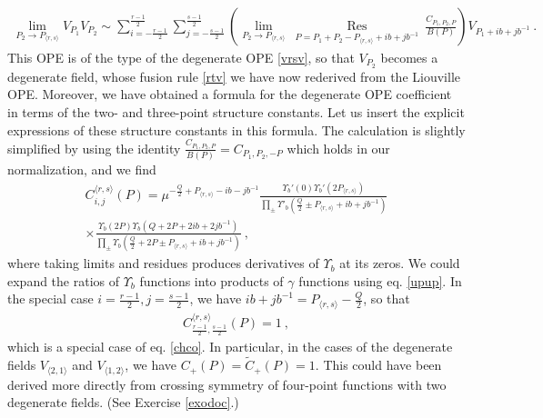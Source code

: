 \documentclass[12pt, a4paper, notitlepage, twoside]{report}
\numberwithin{equation}{section}
\theoremstyle{break}
\begin{document}
\begin{align}
\underset{P_2\to P_{\langle r,s \rangle}}{\lim} V_{P_1}V_{P_2} \sim \sum_{i=-\frac{r-1}{2}}^{\frac{r-1}{2}} \sum_{j=-\frac{s-1}{2}}^{\frac{s-1}{2}}
 \left(\underset{P_2\to P_{\langle r,s \rangle}}{\lim}\ \underset{P=P_1+P_2-P_{\langle r,s \rangle}+ib+jb^{-1}}{\operatorname{ Res}}\ \frac{C_{P_1,P_2,P}}{B(P)}\right) V_{P_1 + ib+jb^{-1}}\ .
\label{crs}
\end{align}
This OPE is of the type of the degenerate OPE \eqref{vrsv}, so that $V_{P_2}$ becomes a degenerate field, whose fusion rule \eqref{rtv} we have now rederived from the Liouville OPE.
Moreover, we have obtained a formula for the degenerate OPE coefficient in terms of the two- and three-point structure constants. Let us insert the explicit expressions of these structure constants in this formula. The calculation is slightly simplified by using the identity $\frac{C_{P_1,P_2,P}}{B(P)} = C_{P_1,P_2,-P}$ which holds in our normalization, and we find
\begin{multline}
 C_{i,j}^{\langle r,s \rangle}(P) = \mu^{-\frac{Q}{2}+P_{\langle r,s\rangle}-ib-jb^{-1}} 
 \frac{\Upsilon_b'(0)\Upsilon_b'(2P_{\langle r,s \rangle})}{\prod_{\pm}\Upsilon'_b(\frac{Q}{2}\pm P_{\langle r,s\rangle} +ib+jb^{-1})} 
 \\ \times 
 \frac{\Upsilon_b(2P)\Upsilon_b(Q+2P+2ib+2jb^{-1})}{\prod_\pm \Upsilon_b(\frac{Q}{2}+2P\pm P_{\langle r,s\rangle} +ib+jb^{-1})}
 \label{cijrs}
 \ ,
\end{multline}
where taking limits and residues produces derivatives of $\Upsilon_b$ at its zeros.
We could expand the ratios of $\Upsilon_b$ functions into products of $\gamma$ functions using eq. \eqref{upup}.
In the special case $i=\frac{r-1}{2}, j=\frac{s-1}{2}$, we have $ib+jb^{-1} = P_{\langle r,s\rangle}-\frac{Q}{2} $, so that 
\begin{align}
 C_{\frac{r-1}{2},\frac{s-1}{2}}^{\langle r,s \rangle}(P) = 1 \ ,
 \label{cco}
\end{align}
which is a special case of eq. \eqref{chco}.
In particular, in the cases of the degenerate fields $V_{\langle 2,1\rangle}$ and $V_{\langle 1,2\rangle}$, we have $C_+(P)=\tilde{C}_+(P)=1$. This could have been derived more directly from crossing symmetry of four-point functions with two degenerate fields. 
(See Exercise \ref{exodoc}.) 
\end{document}
